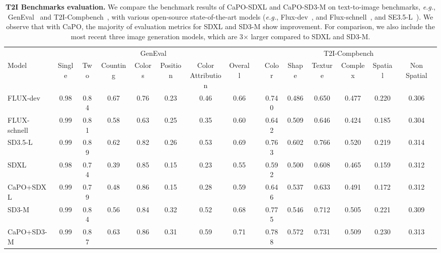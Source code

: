 \begin{table*}[t]
\centering
\small
\vspace{-0.1in}
\centering\small
\setlength\tabcolsep{2pt}
\begin{tabular}{l ccccccc c cccccc}
\toprule
      & \multicolumn{7}{c}{GenEval} && \multicolumn{6}{c}{T2I-Compbench}\\
      \cmidrule(lr){2-8}
      \cmidrule(lr){10-15}
Model & Single & Two & Counting & Colors & Position & \makecell{Color \\ Attribution} & Overall  && Color & Shape & Texture & Complex & Spatial & Non Spatial\\
\midrule
FLUX-dev   & 0.98 & 0.84 & {0.67} & 0.76 & 0.23 & 0.46 & 0.66
&& 0.740 & 0.486 & 0.650 & 0.477 & 0.220 & 0.306 \\
FLUX-schnell & {0.99} & 0.81 & 0.58 & 0.63 & 0.25 & 0.35 & 0.60 
&& 0.642 & 0.509 & 0.646 & 0.424 & 0.185 & 0.304  \\
SD3.5-L & {0.99} & {0.89} & 0.62 & 0.82 & 0.26 & 0.53 & 0.69
&& 0.763 & {0.602} & {0.766} & {0.520} & 0.219 & {0.314} \\
\midrule
SDXL     & 0.98 & 0.74 & 0.39 & 0.85 & 0.15 & 0.23 & 0.55 
&& 0.592 & 0.500 & 0.608 & 0.465 & 0.159 & 0.312 \\
CaPO+SDXL & {0.99} & 0.79 & 0.48 & {0.86} & 0.15 & 0.28 & 0.59 
&& 0.646 & 0.537 & 0.633 & 0.491 &0.172 & 0.312 \\
\midrule
SD3-M & {0.99} & 0.84 & 0.56 & 0.84 & {0.32} & 0.52 & 0.68 
&& 0.775 & 0.546 & 0.712 & 0.505 & 0.221 & 0.309 \\
CaPO+SD3-M & {0.99} & { 0.87} & 0.63 & {0.86} & 0.31 & {0.59} & {0.71} 
&& {0.788} & {0.572} & {0.731} & {0.509} & {0.230} & {0.313} \\
\bottomrule
\end{tabular}
\caption{
\textbf{T2I Benchmarks evaluation.}
We compare the benchmark results of CaPO-SDXL and CaPO-SD3-M on text-to-image benchmarks, \emph{e.g.}, GenEval~\citep{ghosh2024geneval} and T2I-Compbench~\citep{huang2023t2i}, with various open-source state-of-the-art models (\emph{e.g.}, Flux-dev~\citep{flux2024}, and Flux-schnell~\citep{flux2024}, and SE3.5-L~\citep{esser2024scaling}).
We observe that with CaPO, the majority of evaluation metrics for SDXL and SD3-M show improvement. For comparison, we also include the most recent three image generation models, which are 3$\times$ larger compared to SDXL and SD3-M. 
}
\end{table*}

